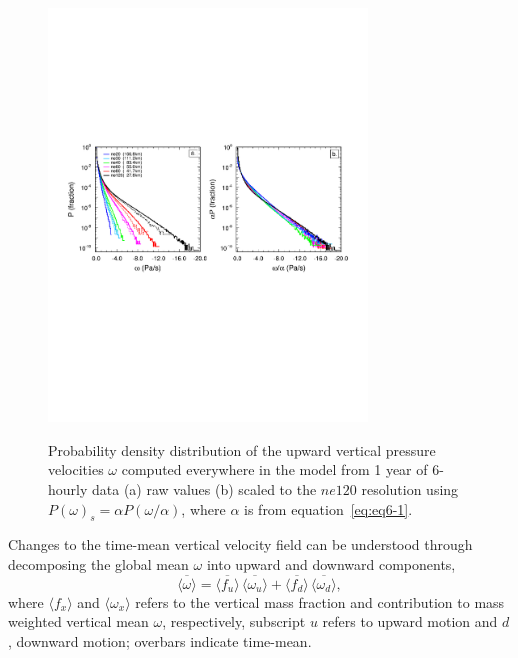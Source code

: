 \begin{figure}[t]
\begin{center}
\noindent\includegraphics[width=20pc,angle=0]{figs/temp_2pdf.pdf}\\
\end{center}
\caption{Probability density distribution of the upward vertical pressure velocities $\omega$ computed everywhere in the model from 1 year of 6-hourly data (a) raw values (b) scaled to the $ne120$ resolution using $P(\omega)_s = \alpha P (\omega / \alpha)$, where $\alpha$ is from equation~\ref{eq:eq6-1}.}
\label{fig:2pdf}
\end{figure}

Changes to the time-mean vertical velocity field can be understood through decomposing the global mean $\omega$ into upward and downward components,
\begin{equation}
\overline{\langle \omega \rangle} = \overline{\langle f_{u} \rangle} \, \overline{\langle \omega_{u} \rangle} + \overline{\langle f_{d} \rangle} \, \overline{\langle \omega_{d} \rangle}, \label{eq:eq6-2}
\end{equation}
where $\langle f_x \rangle$ and $\langle \omega_x \rangle$ refers to the vertical mass fraction and contribution to mass weighted vertical mean $\omega$, respectively, subscript $u$ refers to upward motion and $d$, downward motion; overbars indicate time-mean.

